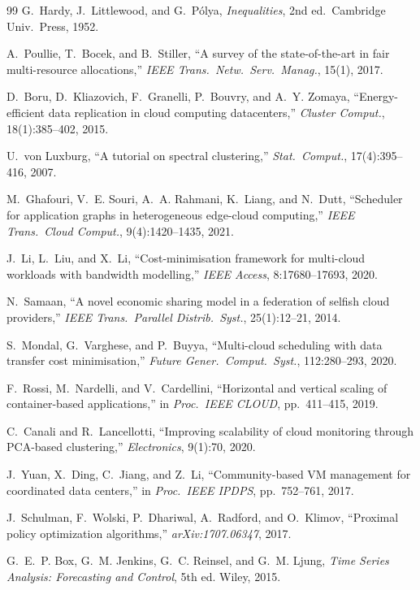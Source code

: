 \documentclass[10pt,journal]{IEEEtran}
\begin{document}
\begin{thebibliography}{99}
G.~Hardy, J.~Littlewood, and G.~P\'olya,
\textit{Inequalities}, 2nd ed.\ Cambridge Univ.~Press, 1952.

A.~Poullie, T.~Bocek, and B.~Stiller,
``A survey of the state-of-the-art in fair multi-resource allocations,''
\textit{IEEE Trans.~Netw.~Serv.~Manag.}, 15(1), 2017.

D.~Boru, D.~Kliazovich, F.~Granelli, P.~Bouvry, and A.~Y. Zomaya,
``Energy-efficient data replication in cloud computing datacenters,''
\textit{Cluster Comput.}, 18(1):385--402, 2015.

U.~von Luxburg,
``A tutorial on spectral clustering,''
\textit{Stat.~Comput.}, 17(4):395--416, 2007.

M.~Ghafouri, V.~E. Souri, A.~A. Rahmani, K.~Liang, and N.~Dutt,
``Scheduler for application graphs in heterogeneous edge-cloud computing,''
\textit{IEEE Trans.~Cloud Comput.}, 9(4):1420--1435, 2021.

J.~Li, L.~Liu, and X.~Li,
``Cost-minimisation framework for multi-cloud workloads with bandwidth modelling,''
\textit{IEEE Access}, 8:17680--17693, 2020.

N.~Samaan,
``A novel economic sharing model in a federation of selfish cloud providers,''
\textit{IEEE Trans.~Parallel Distrib.~Syst.}, 25(1):12--21, 2014.

S.~Mondal, G.~Varghese, and P.~Buyya,
``Multi-cloud scheduling with data transfer cost minimisation,''
\textit{Future Gener.~Comput.~Syst.}, 112:280--293, 2020.

F.~Rossi, M.~Nardelli, and V.~Cardellini,
``Horizontal and vertical scaling of container-based applications,''
in \textit{Proc.~IEEE CLOUD}, pp.~411--415, 2019.

C.~Canali and R.~Lancellotti,
``Improving scalability of cloud monitoring through PCA-based clustering,''
\textit{Electronics}, 9(1):70, 2020.

J.~Yuan, X.~Ding, C.~Jiang, and Z.~Li,
``Community-based VM management for coordinated data centers,''
in \textit{Proc.~IEEE IPDPS}, pp.~752--761, 2017.

J.~Schulman, F.~Wolski, P.~Dhariwal, A.~Radford, and O.~Klimov,
``Proximal policy optimization algorithms,''
\textit{arXiv:1707.06347}, 2017.

G.~E.~P. Box, G.~M. Jenkins, G.~C. Reinsel, and G.~M. Ljung,
\textit{Time Series Analysis: Forecasting and Control}, 5th ed.
Wiley, 2015.


\end{thebibliography}
\end{document}
